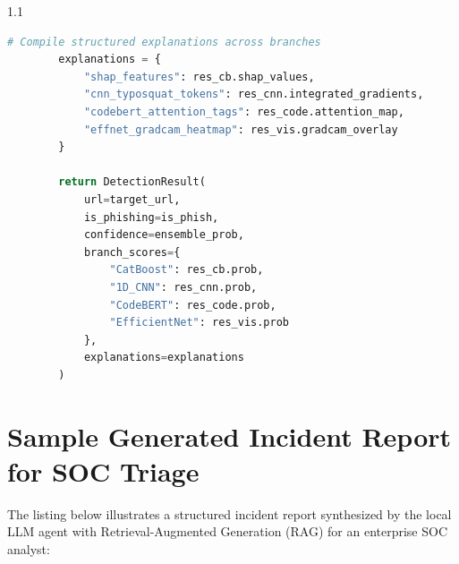 \begin{spacing}{1.1}
\begin{lstlisting}[language=Python, basicstyle=\footnotesize\ttfamily, breaklines=true, frame=single]
        # Compile structured explanations across branches
        explanations = {
            "shap_features": res_cb.shap_values,
            "cnn_typosquat_tokens": res_cnn.integrated_gradients,
            "codebert_attention_tags": res_code.attention_map,
            "effnet_gradcam_heatmap": res_vis.gradcam_overlay
        }

        return DetectionResult(
            url=target_url,
            is_phishing=is_phish,
            confidence=ensemble_prob,
            branch_scores={
                "CatBoost": res_cb.prob,
                "1D_CNN": res_cnn.prob,
                "CodeBERT": res_code.prob,
                "EfficientNet": res_vis.prob
            },
            explanations=explanations
        )
\end{lstlisting}
\end{spacing}

\chapter{Sample Generated Incident Report for SOC Triage}

The listing below illustrates a structured incident report synthesized by the local LLM agent with Retrieval-Augmented Generation (RAG) for an enterprise SOC analyst:

